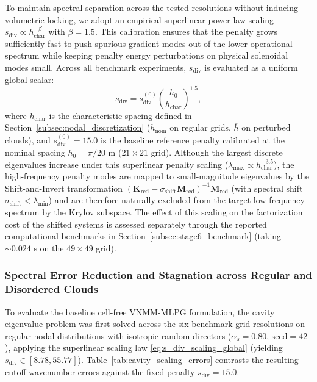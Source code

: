 \documentclass[VANCOUVER,Times1COL]{WileyNJD-v5}
\begin{document}
To maintain spectral separation across the tested resolutions without inducing volumetric locking, we adopt an empirical superlinear power-law scaling $s_{\mathrm{div}} \propto h_{\mathrm{char}}^{-\beta}$ with $\beta = 1.5$. This calibration ensures that the penalty grows sufficiently fast to push spurious gradient modes out of the lower operational spectrum while keeping penalty energy perturbations on physical solenoidal modes small. Across all benchmark experiments, $s_{\mathrm{div}}$ is evaluated as a uniform global scalar:
\begin{equation}
    s_{\mathrm{div}} = s_{\mathrm{div}}^{(0)} \left( \frac{h_0}{h_{\mathrm{char}}} \right)^{1.5},
    \label{eq:s_div_scaling_global}
\end{equation}
where $h_{\mathrm{char}}$ is the characteristic spacing defined in Section~\ref{subsec:nodal_discretization} ($h_{\mathrm{nom}}$ on regular grids, $\overline{h}$ on perturbed clouds), and $s_{\mathrm{div}}^{(0)} = 15.0$ is the baseline reference penalty calibrated at the nominal spacing $h_0 = \pi/20\text{ m}$ ($21\times 21$ grid). Although the largest discrete eigenvalues increase under this superlinear penalty scaling ($\lambda_{\max} \propto h_{\mathrm{char}}^{-3.5}$), the high-frequency penalty modes are mapped to small-magnitude eigenvalues by the Shift-and-Invert transformation $(\mathbf{K}_{\mathrm{red}} - \sigma_{\mathrm{shift}} \mathbf{M}_{\mathrm{red}})^{-1}\mathbf{M}_{\mathrm{red}}$ (with spectral shift $\sigma_{\mathrm{shift}} < \lambda_{\min}$) \cite{saad2011numerical, lehoucq1998arpack} and are therefore naturally excluded from the target low-frequency spectrum by the Krylov subspace. The effect of this scaling on the factorization cost of the shifted systems is assessed separately through the reported computational benchmarks in Section~\ref{subsec:stage6_benchmark} (taking $\sim 0.024\text{ s}$ on the $49\times 49$ grid).

\subsubsection{Spectral Error Reduction and Stagnation across Regular and Disordered Clouds}
\label{subsubsec:cavity_jitter_error}

To evaluate the baseline cell-free VNMM-MLPG formulation, the cavity eigenvalue problem was first solved across the six benchmark grid resolutions on regular nodal distributions with isotropic random directors ($\alpha_s = 0.80$, $\text{seed}=42$), applying the superlinear scaling law \eqref{eq:s_div_scaling_global} (yielding $s_{\mathrm{div}} \in [8.78, 55.77]$). Table~\ref{tab:cavity_scaling_errors} contrasts the resulting cutoff wavenumber errors against the fixed penalty $s_{\mathrm{div}} = 15.0$.
\end{document}
